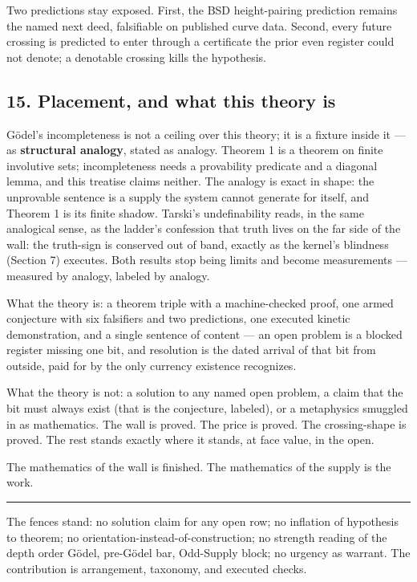 \documentclass[10pt]{article}
\renewcommand{\_}{\origunderscore\allowbreak}
\begin{document}
Two predictions stay exposed. First, the BSD height-pairing prediction
remains the named next deed, falsifiable on published curve data.
Second, every future crossing is predicted to enter through a
certificate the prior even register could not denote; a denotable
crossing kills the hypothesis.

\hypertarget{placement-and-what-this-theory-is}{%
\subsection{15. Placement, and what this theory
is}\label{placement-and-what-this-theory-is}}

Gödel's incompleteness is not a ceiling over this theory; it is a
fixture inside it --- as \textbf{structural analogy}, stated as analogy.
Theorem 1 is a theorem on finite involutive sets; incompleteness needs a
provability predicate and a diagonal lemma, and this treatise claims
neither. The analogy is exact in shape: the unprovable sentence is a
supply the system cannot generate for itself, and Theorem 1 is its
finite shadow. Tarski's undefinability reads, in the same analogical
sense, as the ladder's confession that truth lives on the far side of
the wall: the truth-sign is conserved out of band, exactly as the
kernel's blindness (Section 7) executes. Both results stop being limits
and become measurements --- measured by analogy, labeled by analogy.

What the theory is: a theorem triple with a machine-checked proof, one
armed conjecture with six falsifiers and two predictions, one executed
kinetic demonstration, and a single sentence of content --- an open
problem is a blocked register missing one bit, and resolution is the
dated arrival of that bit from outside, paid for by the only currency
existence recognizes.

What the theory is not: a solution to any named open problem, a claim
that the bit must always exist (that is the conjecture, labeled), or a
metaphysics smuggled in as mathematics. The wall is proved. The price is
proved. The crossing-shape is proved. The rest stands exactly where it
stands, at face value, in the open.

The mathematics of the wall is finished. The mathematics of the supply
is the work.

\begin{center}\rule{0.5\linewidth}{0.5pt}\end{center}

The fences stand: no solution claim for any open row; no inflation of
hypothesis to theorem; no orientation-instead-of-construction; no
strength reading of the depth order Gödel, pre-Gödel bar, Odd-Supply
block; no urgency as warrant. The contribution is arrangement, taxonomy,
and executed checks.
\end{document}
